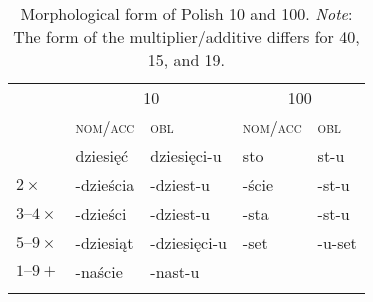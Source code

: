 \documentclass[output=paper]{langscibook}
\begin{document}
\begin{table}
\caption{Morphological form of Polish 10 and 100. \textit{Note}: The form of the multiplier/additive differs for 40, 15, and 19.}
\label{klo:tab:Polish10,100b}
 \begin{tabular}{lllll} 
  \lsptoprule
   & \multicolumn{2}{c}{10} & \multicolumn{2}{c}{100}\\\cmidrule(lr){2-3}\cmidrule(lr){4-5}
   & \textsc{nom/acc} & \textsc{obl}  &\textsc{nom/acc} & \textsc{obl}\\
  \midrule
   & dziesięć & dziesięci-u  & sto & st-u  \\
  $2\times{}$%
  & -dzieścia & -dziest-u  & -ście & -st-u \\
  $3\text{--}4\times{}$%
  & -dzieści & -dziest-u  & -sta & -st-u  \\
  $5\text{--}9\times{}$ 
  & -dziesiąt & -dziesięci-u  & -set & -u-set  \\
  $1\text{--}9+{}$%
  & -naście & -nast-u & \\
  \lspbottomrule  
 \end{tabular}
\end{table}
\end{document}
